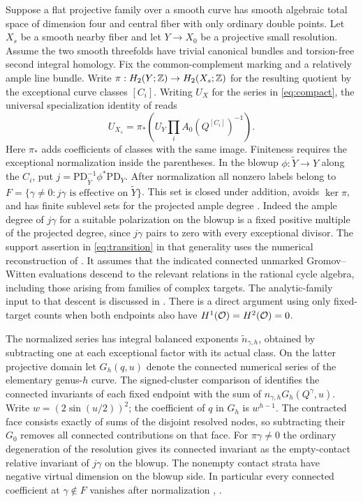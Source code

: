 Suppose a flat projective family over a smooth curve has smooth
algebraic total space of dimension four and central fiber with only
ordinary double points. Let $X_s$ be a smooth nearby fiber and let
$Y\to X_0$ be a projective small resolution. Assume the two smooth
threefolds have trivial canonical bundles and torsion-free second
integral homology. Fix the common-complement marking and a relatively
ample line bundle. Write $\pi:H_2(Y;\mathbb Z)\to H_2(X_s;\mathbb Z)$ for the
resulting quotient by the exceptional curve classes $[C_i]$.
Writing $U_X$ for the series in \eqref{eq:compact}, the universal
specialization identity of \cite[Theorem~3.2]{WueConifold} reads
\begin{equation}\label{eq:transition}
 U_{X_s}=\pi_*\left(U_Y\prod_i A_0(Q^{[C_i]})^{-1}\right).
\end{equation}
Here $\pi_*$ adds coefficients of classes with the same image.
Finiteness requires the exceptional normalization inside the parentheses.
In the blowup $\phi:\widetilde Y\to Y$ along the $C_i$, put
$j=\mathrm{PD}_{\widetilde Y}^{-1}\phi^*\mathrm{PD}_Y$. After normalization
all nonzero labels belong to
$F=\{\gamma\ne0:j\gamma\text{ is effective on }\widetilde Y\}$.
This set is closed under addition, avoids $\ker\pi$, and has finite
sublevel sets for the projected ample degree
\cite[Proposition~3.1]{WueConifold}. Indeed the ample degree of $j\gamma$
for a suitable polarization on the blowup is a fixed positive
multiple of the projected degree, since $j\gamma$ pairs to zero with
every exceptional divisor. The support assertion in \eqref{eq:transition}
in that generality uses the numerical reconstruction of
\cite[\S2]{WueConifold}. It assumes that the indicated connected unmarked
Gromov--Witten evaluations descend to the relevant relations in the
rational cycle algebra, including those arising from families of
complex targets. The analytic-family input to that descent is discussed
in \cite[Remark~1.8]{Pardon}. There is a direct argument using only
fixed-target counts when both endpoints also have
$H^1(\mathcal O)=H^2(\mathcal O)=0$.

The normalized series has integral balanced exponents
$\widetilde n_{\gamma,h}$, obtained by subtracting one at each
exceptional factor with its actual class. On the latter projective
domain let $G_h(q,u)$ denote the connected numerical series of the
elementary genus-$h$ curve. The signed-cluster comparison of
\cite[\S7.4]{WueProduct} identifies the connected invariants of each fixed
endpoint with the sum of $n_{\gamma,h}G_h(Q^\gamma,u)$. Write
$w=(2\sin(u/2))^2$; the coefficient of $q$ in $G_h$ is $w^{h-1}$.
The contracted face consists exactly of sums of the disjoint resolved
nodes, so subtracting their $G_0$ removes all connected contributions
on that face. For $\pi\gamma\ne0$ the ordinary degeneration of the
resolution gives its connected invariant as the empty-contact
relative invariant of $j\gamma$ on the blowup. The nonempty contact
strata have negative virtual dimension on the blowup side. In
particular every connected coefficient at $\gamma\notin F$ vanishes
after normalization \cite[\S2.1]{LLW}, \cite[\S3]{WueConifold}.

